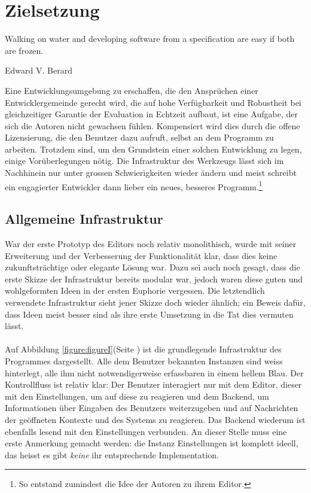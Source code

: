 \newpage

\section{Zielsetzung} \label{sec:Ziel}
\epigraph{Walking on water and developing software from a specification are easy if both are frozen.}{Edward V. Berard}
	Eine Entwicklungsumgebung zu erschaffen, die den Ansprüchen einer Entwicklergemeinde gerecht wird, die auf hohe Verfügbarkeit und Robustheit bei 
    gleichzeitiger Garantie der Evaluation in Echtzeit aufbaut, ist eine Aufgabe, der sich die Autoren nicht gewachsen fühlen. Kompensiert wird dies
    durch die offene Lizensierung, die den Benutzer dazu aufruft, selbst an dem Programm zu arbeiten. Trotzdem sind, um den Grundstein einer solchen
    Entwicklung zu legen, einige Vorüberlegungen nötig. Die Infrastruktur des Werkzeugs lässt sich im Nachhinein nur unter grossen Schwierigkeiten 
    wieder ändern und meist schreibt ein engagierter Entwickler dann lieber ein neues, besseres Programm.\footnote{So entstand zumindest die Idee der
    Autoren zu ihrem Editor.}
\subsection{Allgemeine Infrastruktur}
    War der erste Prototyp des Editors noch relativ monolithisch, wurde mit seiner Erweiterung und der Verbesserung der Funktionalität klar,
    dass dies keine zukunftsträchtige oder elegante Lösung war. Dazu sei auch noch gesagt, dass die erste Skizze der Infrastruktur bereits modular
    war, jedoch waren diese guten und wohlgeformten Ideen in der ersten Euphorie vergessen. Die letztendlich verwendete Infrastruktur sieht jener
    Skizze doch wieder ähnlich; ein Beweis dafür, dass Ideen meist besser sind als ihre erste Umsetzung in die Tat dies vermuten lässt.
\paragraph{}
    Auf Abbildung \ref{figure:figureI}(Seite \pageref{figure:figureI}) ist die grundlegende Infrastruktur des Programmes dargestellt. Alle dem Benutzer 
    bekannten Instanzen sind weiss hinterlegt, alle ihm nicht notwendigerweise erfassbaren in einem hellem Blau. Der Kontrollfluss ist relativ klar: Der 
    Benutzer interagiert nur mit dem Editor, dieser mit den Einstellungen, um auf diese zu reagieren und dem Backend, um Informationen über Eingaben des 
    Benutzers weiterzugeben und auf Nachrichten der geöffneten Kontexte und des Systems zu reagieren. Das Backend wiederum ist ebenfalls lesend mit den 
    Einstellungen verbunden. An dieser Stelle muss eine erste Anmerkung gemacht werden: die Instanz Einstellungen ist komplett ideell, das heisst es gibt 
    \textit{keine} ihr entsprechende Implementation.
